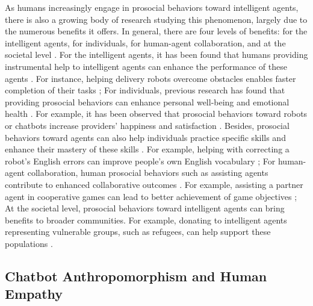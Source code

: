As humans increasingly engage in prosocial behaviors toward intelligent agents, there is also a growing body of research studying this phenomenon, largely due to the numerous benefits it offers. In general, there are four levels of benefits: for the intelligent agents, for individuals, for human-agent collaboration, and at the societal level \cite{OLIVEIRA2021106547, zhu2025benefits}. For the intelligent agents, it has been found that humans providing instrumental help to intelligent agents can enhance the performance of these agents \cite{NIELSEN2022260, dobrosovestnova2022little, kuhnlenz2013increasing, martin2020investigating}. For instance, helping delivery robots overcome obstacles enables faster completion of their tasks \cite{chi2024should, dobrosovestnova2022little}; For individuals, previous research has found that providing prosocial behaviors can enhance personal well-being and emotional health \cite{rahal2024providing, aknin2013prosocial, kawakami2023systems, nishiwaki2017ibones}. For example, it has been observed that prosocial behaviors toward robots or chatbots increase providers' happiness and satisfaction \cite{okada2022weak, zhu2025benefits}. Besides, prosocial behaviors toward agents can also help individuals practice specific skills and enhance their mastery of these skills \cite{howell2011momentary, Lee2019caring, lorinkova2019importance}. For example, helping with correcting a robot's English errors can improve people's own English vocabulary \cite{howell2011momentary}; For human-agent collaboration, human prosocial behaviors such as assisting agents contribute to enhanced collaborative outcomes \cite{NIELSEN2022260, OLIVEIRA2021106547}. For example, assisting a partner agent in cooperative games can lead to better achievement of game objectives \cite{ashktorab2020human}; At the societal level, prosocial behaviors toward intelligent agents can bring benefits to broader communities. For example, donating to intelligent agents representing vulnerable groups, such as refugees, can help support these populations \cite{Kim2014donate,Shiomi2017hug, namkoong2023effect}.



\subsection{Chatbot Anthropomorphism and Human Empathy}

